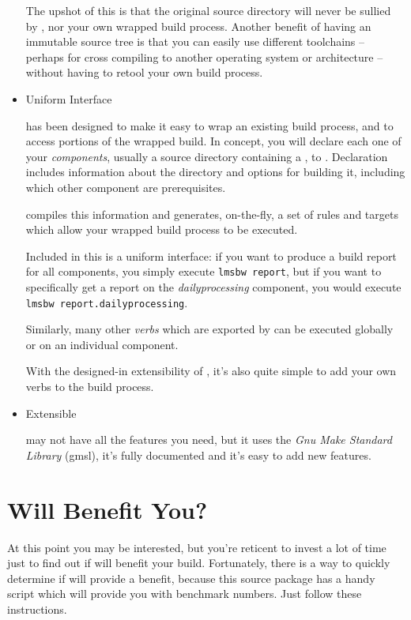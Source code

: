 \begin{itemize}
  The upshot of this is that the original source directory will never
  be sullied by \lmsbw, nor your own wrapped build process.  Another
  benefit of having an immutable source tree is that you can easily
  use different toolchains -- perhaps for cross compiling to another
  operating system or architecture -- without having to retool your
  own build process.

\item Uniform Interface

  \lmsbw has been designed to make it easy to wrap an existing build
  process, and to access portions of the wrapped build.  In concept,
  you will declare each one of your \emph{components}, usually a
  source directory containing a \makefile, to \lmsbw.  Declaration
  includes information about the directory and options for building
  it, including which other component are prerequisites.

  \lmsbw compiles this information and generates, on-the-fly, a set of
  \make rules and targets which allow your wrapped build process to be
  executed.

  Included in this is a uniform interface: if you want to produce a
  build report for all components, you simply execute \texttt{lmsbw
    report}, but if you want to specifically get a report on the
  \emph{dailyprocessing} component, you would execute \texttt{lmsbw
    report.dailyprocessing}.

  Similarly, many other \emph{verbs} which are exported by \lmsbw can
  be executed globally or on an individual component.

  With the designed-in extensibility of \lmsbw, it's also quite simple
  to add your own verbs to the build process.

\item Extensible

  \lmsbw may not have all the features you need, but it uses the
  \emph{Gnu Make Standard Library} (gmsl), it's fully documented and
  it's easy to add new features.

\end{itemize}

\section{Will \lmsbw Benefit You?}

At this point you may be interested, but you're reticent to invest a
lot of time just to find out if \lmsbw will benefit your build.
Fortunately, there is a way to quickly determine if \lmsbw will
provide a benefit, because this source package has a handy script
which will provide you with benchmark numbers.  Just follow these
instructions.

